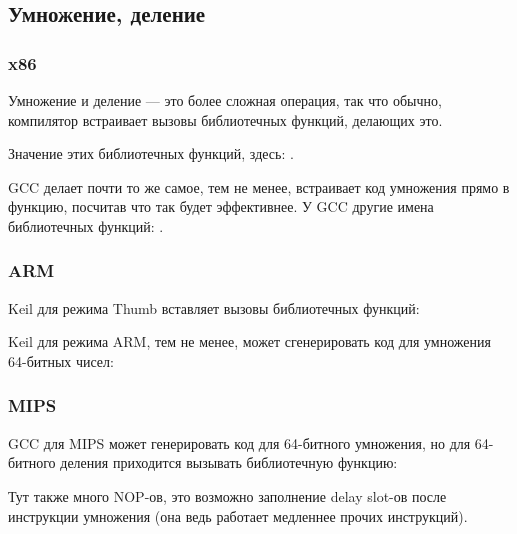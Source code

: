 ﻿\subsection{Умножение, деление}



\subsubsection{x86}



Умножение и деление --- это более сложная операция, так что обычно, компилятор встраивает вызовы библиотечных функций,
делающих это.

Значение этих библиотечных функций, здесь: .



GCC делает почти то же самое, тем не менее,
встраивает код умножения прямо в функцию, посчитав что так будет эффективнее.
У GCC другие имена библиотечных функций: .

\subsubsection{ARM}

Keil для режима Thumb вставляет вызовы библиотечных функций:



Keil для режима ARM, тем не менее, может сгенерировать код для умножения 64-битных чисел:




\subsubsection{MIPS}

\Optimizing GCC для MIPS может генерировать код для 64-битного умножения, но для 64-битного деления приходится вызывать библиотечную функцию:



Тут также много \ac{NOP}-ов, это возможно заполнение delay slot-ов после инструкции умножения (она ведь работает
медленнее прочих инструкций).

